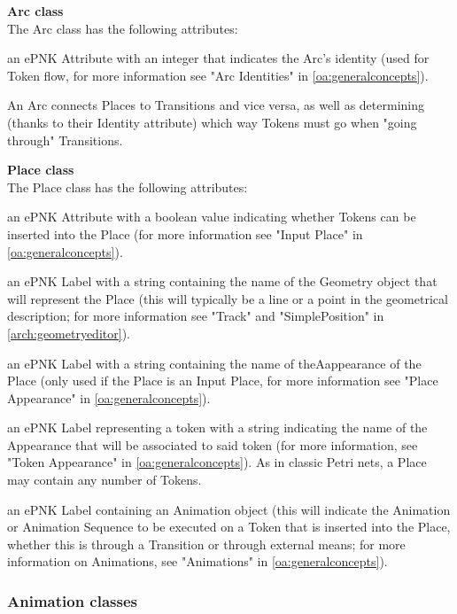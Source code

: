 \newpage
\textbf{Arc class} \\
The Arc class has the following attributes:
\begin{description}[labelindent=1cm]
  \item[Identity:] an ePNK Attribute with an integer that indicates the Arc's identity (used
for Token flow, for more information see "Arc Identities" in \ref{oa:generalconcepts}).
\end{description}

An Arc connects Places to Transitions and vice versa, as well as determining (thanks to
their Identity attribute) which way Tokens must go when "going through" Transitions.

\textbf{Place class} \\
The Place class has the following attributes:
\begin{description}[labelindent=1cm]
  \item[InteractiveInput:] an ePNK Attribute with a boolean value indicating whether Tokens
can be inserted into the Place (for more information see "Input Place" in \ref{oa:generalconcepts}).
  \item[GeometryLabel:] an ePNK Label with a string containing the name of the Geometry object
that will represent the Place (this will typically be a line or a point in the geometrical
description; for more information see "Track" and "SimplePosition" in \ref{arch:geometryeditor}).
  \item[InputPlaceAppearance:] an ePNK Label with a string containing the name of theAappearance
of the Place (only used if the Place is an Input Place, for more information see "Place Appearance"
in \ref{oa:generalconcepts}).
  \item[Token:] an ePNK Label representing a token with a string indicating the name of the
Appearance that will be associated to said token (for more information, see
"Token Appearance" in \ref{oa:generalconcepts}). As in classic Petri nets, a Place may contain any number of Tokens.
  \item[AnimationLabel:] an ePNK Label containing an Animation object (this will indicate the
Animation or Animation Sequence to be executed on a Token that is inserted into the Place,
whether this is through a Transition or through external means; for more information on Animations,
see "Animations" in \ref{oa:generalconcepts}).
\end{description}


\subsubsection{Animation classes}

